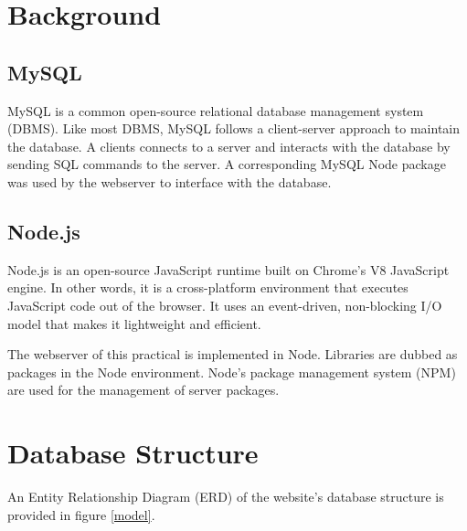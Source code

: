 \documentclass[a4paper,12pt]{article}
\numberwithin{equation}{section} %
\numberwithin{figure}{section}
\begin{document}
\section{Background}

\subsection{MySQL}
MySQL is a common open-source relational database management system (DBMS). Like most DBMS, MySQL follows a client-server approach to maintain the database. A clients connects to a server and interacts with the database by sending SQL commands to the server. A corresponding MySQL Node package was used by the webserver to interface with the database.


\subsection{Node.js}
Node.js is an open-source JavaScript runtime built on Chrome's V8 JavaScript engine. In other words, it is a cross-platform environment that executes JavaScript code out of the browser. It uses an event-driven, non-blocking I/O model that makes it lightweight and efficient.

The webserver of this practical is implemented in Node. Libraries are dubbed as packages in the Node environment. Node's package management system (NPM) are used for the management of server packages.


\pagebreak
\section{Database Structure}
An Entity Relationship Diagram (ERD) of the website's database structure is provided in figure \ref{model}.
\end{document}

